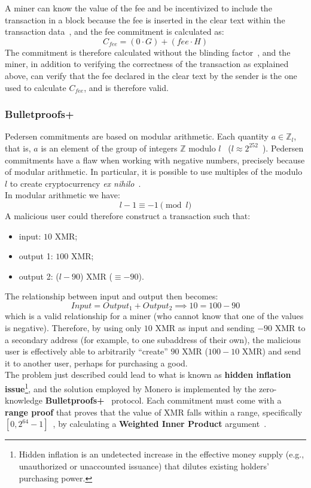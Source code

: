 \documentclass[conference]{IEEEtran}
\begin{document}
A miner can know the value of the fee and be incentivized to include the transaction in a block because the fee is inserted in the clear text within the transaction data~\cite{zero_to_monero_2}, and the fee commitment is calculated as:
\[
C_{fee} = (0 \cdot G) + (fee \cdot H)
\]
The commitment is therefore calculated without the blinding factor~\cite{zero_to_monero_2}, and the miner, in addition to verifying the correctness of the transaction as explained above, can verify that the fee declared in the clear text by the sender is the one used to calculate $C_{fee}$, and is therefore valid.

\subsubsection{Bulletproofs+}
Pedersen commitments are based on modular arithmetic. Each quantity $a \in \mathbb{Z}_l$, that is, $a$ is an element of the group of integers $\mathbb{Z}$ modulo $l$~\cite{pedersen_commitments} ($l \approx 2^{252}$~\cite{monero_ed25519}). Pedersen commitments have a flaw when working with negative numbers, precisely because of modular arithmetic. In particular, it is possible to use multiples of the modulo $l$ to create cryptocurrency \emph{ex nihilo}~\cite{zero_to_monero_2}.\\
In modular arithmetic we have:
\[
l - 1 \equiv -1 \pmod{l}
\]
A malicious user could therefore construct a transaction such that:
\begin{itemize}
\item input: $10$ XMR;
\item output 1: $100$ XMR;
\item output 2: ($l - 90$) XMR ($\equiv -90$).
\end{itemize}
The relationship between input and output then becomes:
\[
Input = Output_1 + Output_2 \implies 10 = 100 - 90
\]
which is a valid relationship for a miner (who cannot know that one of the values is negative). Therefore, by using only $10$ XMR as input and sending $-90$ XMR to a secondary address (for example, to one subaddress of their own), the malicious user is effectively able to arbitrarily ``create'' $90$ XMR ($100 - 10$ XMR) and send it to another user, perhaps for purchasing a good.\\
The problem just described could lead to what is known as \textbf{hidden inflation issue}\footnote{Hidden inflation is an undetected increase in the effective money supply (e.g., unauthorized or unaccounted issuance) that dilutes existing holders' purchasing power.}, and the solution employed by Monero is implemented by the zero-knowledge \textbf{Bulletproofs+}~\cite{bulletproofs_plus} protocol. Each commitment must come with a \textbf{range proof} that proves that the value of XMR falls within a range, specifically $[0, 2^{64} - 1]$~\cite{zero_to_monero_2}, by calculating a \textbf{Weighted Inner Product} argument~\cite{bulletproofs_plus, bulletproofs_plus_security_audit}.
\end{document}
